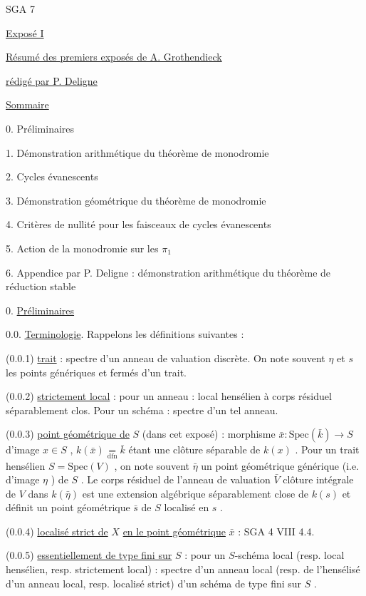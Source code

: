 


SGA 7


\underline{Exposé I}


\underline{Résumé des premiers exposés de A. Grothendieck}


\underline{rédigé par P. Deligne}


\underline{Sommaire}

0. Préliminaires

1. Démonstration arithmétique du théorème de monodromie

2. Cycles évanescents

3. Démonstration géométrique du théorème de monodromie

4. Critères de nullité pour les faisceaux de cycles évanescents

5. Action de la monodromie sur les $\pi_1$

6. Appendice par P. Deligne : démonstration arithmétique du
théorème de réduction stable


0. \underline{Préliminaires}

0.0. \underline{Terminologie}. Rappelons les définitions suivantes :

(0.0.1)    \underline{trait} : spectre d'un anneau de valuation discrète. On note souvent  $\eta$  et  $s$  les points génériques et fermés d'un trait.

(0.0.2)    \underline{strictement local} : pour un anneau : local hensélien à corps résiduel séparablement clos. Pour un schéma : spectre d'un tel anneau.

(0.0.3)    \underline{point géométrique de}  $S$  (dans cet exposé) : morphisme  $\bar{x} : \mathrm{Spec}(\bar{k}) \longrightarrow S$  d'image  $x \in S$ , $k(\bar{x}) \underset{\mathrm{dfn}}{=} \bar{k}$  étant une clôture séparable de  $k(x)$ . Pour un trait hensélien  $S = \mathrm{Spec}(V)$ , on note souvent  $\bar{\eta}$  un point géométrique générique (i.e. d'image  $\eta$ ) de  $S$ . Le corps résiduel de l'anneau de valuation  $\bar{V}$  clôture intégrale de  $V$  dans  $k(\bar{\eta})$  est une extension algébrique séparablement close de  $k(s)$  et définit un point géométrique  $\bar{s}$  de  $S$  localisé en  $s$ .



(0.0.4)    \underline{localisé strict de}  $X$  \underline{en le point géométrique}  $\bar{x}$  : SGA 4 VIII 4.4.

(0.0.5)    \underline{essentiellement de type fini sur}  $S$ : pour un $S$-schéma local (resp. local hensélien, resp. strictement local) : spectre d'un anneau local (resp. de l'hensélisé d'un anneau local, resp. localisé strict) d'un schéma de type fini sur  $S$ .


